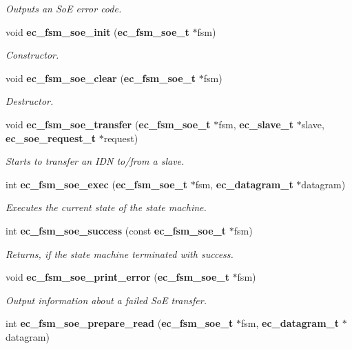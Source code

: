 \begin{DoxyCompactItemize}
\begin{DoxyCompactList}\small\item\em \-Outputs an \-So\-E error code. \end{DoxyCompactList}\item 
void {\bf ec\-\_\-fsm\-\_\-soe\-\_\-init} ({\bf ec\-\_\-fsm\-\_\-soe\-\_\-t} $\ast$fsm)
\begin{DoxyCompactList}\small\item\em \-Constructor. \end{DoxyCompactList}\item 
void {\bf ec\-\_\-fsm\-\_\-soe\-\_\-clear} ({\bf ec\-\_\-fsm\-\_\-soe\-\_\-t} $\ast$fsm)
\begin{DoxyCompactList}\small\item\em \-Destructor. \end{DoxyCompactList}\item 
void {\bf ec\-\_\-fsm\-\_\-soe\-\_\-transfer} ({\bf ec\-\_\-fsm\-\_\-soe\-\_\-t} $\ast$fsm, {\bf ec\-\_\-slave\-\_\-t} $\ast$slave, {\bf ec\-\_\-soe\-\_\-request\-\_\-t} $\ast$request)
\begin{DoxyCompactList}\small\item\em \-Starts to transfer an \-I\-D\-N to/from a slave. \end{DoxyCompactList}\item 
int {\bf ec\-\_\-fsm\-\_\-soe\-\_\-exec} ({\bf ec\-\_\-fsm\-\_\-soe\-\_\-t} $\ast$fsm, {\bf ec\-\_\-datagram\-\_\-t} $\ast$datagram)
\begin{DoxyCompactList}\small\item\em \-Executes the current state of the state machine. \end{DoxyCompactList}\item 
int {\bf ec\-\_\-fsm\-\_\-soe\-\_\-success} (const {\bf ec\-\_\-fsm\-\_\-soe\-\_\-t} $\ast$fsm)
\begin{DoxyCompactList}\small\item\em \-Returns, if the state machine terminated with success. \end{DoxyCompactList}\item 
void {\bf ec\-\_\-fsm\-\_\-soe\-\_\-print\-\_\-error} ({\bf ec\-\_\-fsm\-\_\-soe\-\_\-t} $\ast$fsm)
\begin{DoxyCompactList}\small\item\em \-Output information about a failed \-So\-E transfer. \end{DoxyCompactList}\item 
int {\bf ec\-\_\-fsm\-\_\-soe\-\_\-prepare\-\_\-read} ({\bf ec\-\_\-fsm\-\_\-soe\-\_\-t} $\ast$fsm, {\bf ec\-\_\-datagram\-\_\-t} $\ast$datagram)

\end{DoxyCompactItemize}
